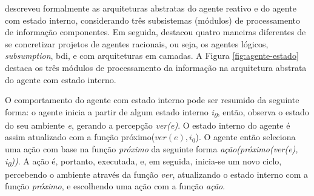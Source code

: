     \begin{figure}[h!]
        \centering
    \end{figure}

     descreveu formalmente as arquiteturas abstratas do agente reativo e do agente com estado interno, considerando três subsistemas (módulos) de processamento de informação componentes. Em seguida, destacou quatro maneiras diferentes de se concretizar projetos de agentes racionais, ou seja, os agentes lógicos, \textit{subsumption}, \acrshort{bdi}, e com arquiteturas em camadas. A Figura \ref{fig:agente-estado} destaca os três módulos de processamento da informação na arquitetura abstrata do agente com estado interno.
    
    \clearpage
    \begin{figure}[h!]
        \centering
    \end{figure}
    

    O comportamento do agente com estado interno pode ser resumido da seguinte forma: o agente inicia a partir de algum estado interno \emph{i\textsubscript{0}}, então, observa o estado do seu ambiente \emph{e}, gerando a percepção \emph{ver(e)}. O estado interno do agente é assim atualizado com a função próximo($ver(e), i_0$). O agente então seleciona uma ação com base na função \emph{próximo} da seguinte forma \emph{ação(próximo(ver(e), i\textsubscript{0}))}. A ação é, portanto, executada, e, em seguida, inicia-se um novo ciclo, percebendo o ambiente através da função \emph{ver}, atualizando o estado interno com a função \emph{próximo}, e escolhendo uma ação com a função \emph{ação}. 

